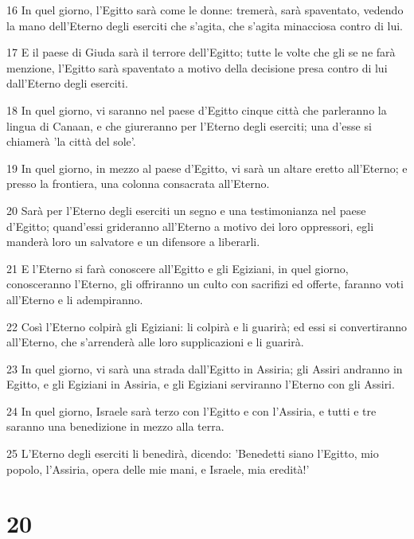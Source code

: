 \par 16 In quel giorno, l'Egitto sarà come le donne: tremerà, sarà spaventato, vedendo la mano dell'Eterno degli eserciti che s'agita, che s'agita minacciosa contro di lui.
\par 17 E il paese di Giuda sarà il terrore dell'Egitto; tutte le volte che gli se ne farà menzione, l'Egitto sarà spaventato a motivo della decisione presa contro di lui dall'Eterno degli eserciti.
\par 18 In quel giorno, vi saranno nel paese d'Egitto cinque città che parleranno la lingua di Canaan, e che giureranno per l'Eterno degli eserciti; una d'esse si chiamerà 'la città del sole'.
\par 19 In quel giorno, in mezzo al paese d'Egitto, vi sarà un altare eretto all'Eterno; e presso la frontiera, una colonna consacrata all'Eterno.
\par 20 Sarà per l'Eterno degli eserciti un segno e una testimonianza nel paese d'Egitto; quand'essi grideranno all'Eterno a motivo dei loro oppressori, egli manderà loro un salvatore e un difensore a liberarli.
\par 21 E l'Eterno si farà conoscere all'Egitto e gli Egiziani, in quel giorno, conosceranno l'Eterno, gli offriranno un culto con sacrifizi ed offerte, faranno voti all'Eterno e li adempiranno.
\par 22 Così l'Eterno colpirà gli Egiziani: li colpirà e li guarirà; ed essi si convertiranno all'Eterno, che s'arrenderà alle loro supplicazioni e li guarirà.
\par 23 In quel giorno, vi sarà una strada dall'Egitto in Assiria; gli Assiri andranno in Egitto, e gli Egiziani in Assiria, e gli Egiziani serviranno l'Eterno con gli Assiri.
\par 24 In quel giorno, Israele sarà terzo con l'Egitto e con l'Assiria, e tutti e tre saranno una benedizione in mezzo alla terra.
\par 25 L'Eterno degli eserciti li benedirà, dicendo: 'Benedetti siano l'Egitto, mio popolo, l'Assiria, opera delle mie mani, e Israele, mia eredità!'

\chapter{20}

